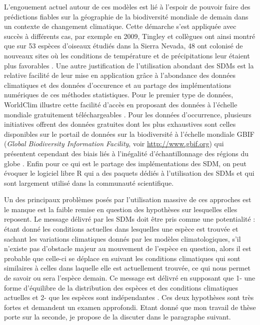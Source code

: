 L'engouement actuel autour de ces modèles est lié à l'espoir de pouvoir
faire des prédictions fiables sur la géographie de la biodiversité
mondiale de demain dans un contexte de changement climatique. Cette
démarche s'est appliquée avec succès à différents cas, par exemple en
2009, Tingley et collègues ont ainsi montré que sur 53 espèces d'oiseaux
étudiés dans la Sierra Nevada, 48 ont colonisé de nouveaux sites où les
conditions de température et de précipitations leur étaient plus
favorables \citep{Tingley2009}. Une autre justification de l'utilisation
abondant des SDMs est la relative facilité de leur mise en application
grâce à l'abondance des données climatiques et des données d'occurence
et au partage des implémentations numériques de ces méthodes
statistiques. Pour le premier type de données, WorldClim illustre cette
facilité d'accès en proposant des données à l'échelle mondiale
gratuitement téléchargeables \citep[voir
\url{http://worldclim.org}][]{Hijmans2005}. Pour les données
d'occurrence, plusieurs initiatives offrent des données gratuites dont
les plus exhaustives sont celles disponibles sur le portail de données
sur la biodiversité à l'échelle mondiale GBIF (\emph{Global Biodiversity
Information Facility}, voir \url{http://www.gbif.org}) qui présentent
cependant des biais liés à l'inégalité d'échantillonnage des régions du
globe \citep{Beck2014a}. Enfin pour ce qui est le partage des
implémentations des SDM, on peut évoquer le logiciel libre R
\citep{Rcoreteam2015} qui a des paquets dédiés à l'utilisation des SDMs
et qui sont largement utilisé dans la communauté scientifique.

Un des principaux problèmes posés par l'utilisation massive de ces
approches est le manque est la faible remise en question des hypothèses
sur lesquelles elles reposent. Le message délivré par les SDMs doit être
pris comme une potentialité : étant donné les conditions actuelles dans
lesquelles une espèce est trouvée et sachant les variations climatiques
donnés par les modèles climatologiques, s'il n'existe pas d'obstacle
majeur au mouvement de l'espèce en question, alors il est probable que
celle-ci se déplace en suivant les conditions climatiques qui sont
similaires à celles dans laquelle elle est actuellement trouvée, ce qui
nous permet de savoir ou sera l'espèce demain. Ce message est délivré en
supposant que 1- une forme d'équilibre de la distribution des espèces et
des conditions climatiques actuelles et 2- que les espèces sont
indépendantes \citep{Jeschke2008}. Ces deux hypothèses sont très fortes
et demandent un examen approfondi. Etant donné que mon travail de thèse
porte sur la seconde, je propose de la discuter dans le paragraphe
suivant.

